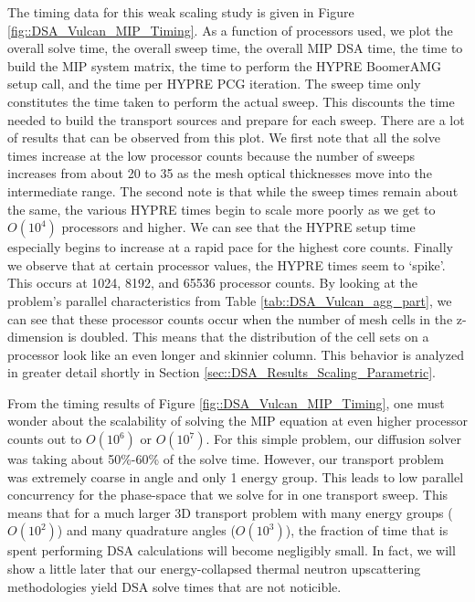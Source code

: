 The timing data for this weak scaling study is given in Figure \ref{fig::DSA_Vulcan_MIP_Timing}. As a function of processors used, we plot the overall solve time, the overall sweep time, the overall MIP DSA time, the time to build the MIP system matrix, the time to perform the HYPRE BoomerAMG setup call, and the time per HYPRE PCG iteration. The sweep time only constitutes the time taken to perform the actual sweep. This discounts the time needed to build the transport sources and prepare for each sweep. There are a lot of results that can be observed from this plot. We first note that all the solve times increase at the low processor counts because the number of sweeps increases from about 20 to 35 as the mesh optical thicknesses move into the intermediate range. The second note is that while the sweep times remain about the same, the various HYPRE times begin to scale more poorly as we get to $O(10^4)$ processors and higher. We can see that the HYPRE setup time especially begins to increase at a rapid pace for the highest core counts. Finally we observe that at certain processor values, the HYPRE times seem to `spike'. This occurs at 1024, 8192, and 65536 processor counts. By looking at the problem's parallel characteristics from Table \ref{tab::DSA_Vulcan_agg_part}, we can see that these processor counts occur when the number of mesh cells in the z-dimension is doubled. This means that the distribution of the cell sets on a processor look like an even longer and skinnier column. This behavior is analyzed in greater detail shortly in Section \ref{sec::DSA_Results_Scaling_Parametric}.

From the timing results of Figure \ref{fig::DSA_Vulcan_MIP_Timing}, one must wonder about the scalability of solving the MIP equation at even higher processor counts out to $O(10^6)$ or $O(10^7)$. For this simple problem, our diffusion solver was taking about 50\%-60\% of the solve time. However, our transport problem was extremely coarse in angle and only 1 energy group. This leads to low parallel concurrency for the phase-space that we solve for in one transport sweep. This means that for a much larger 3D transport problem with many energy groups ($O(10^2)$) and many quadrature angles ($O(10^3)$), the fraction of time that is spent performing DSA calculations will become negligibly small. In fact, we will show a little later that our energy-collapsed thermal neutron upscattering methodologies yield DSA solve times that are not noticible.


